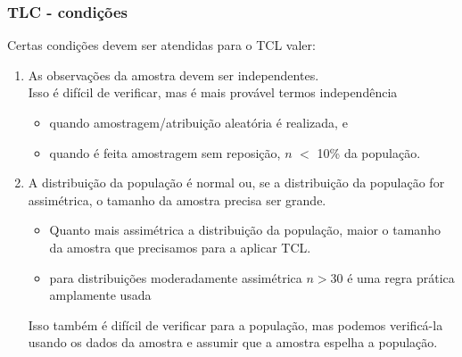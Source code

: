 \begin{frame}
\frametitle{TLC - condições}
\justifying
Certas condições devem ser atendidas para o TCL valer:

\begin{enumerate}
\justifying
\footnotesize
\item {} As observações da amostra devem ser independentes. \\
\justifying
Isso é difícil de verificar, mas é mais provável termos independência 
\begin{itemize}
\footnotesize
\justifying
\item quando amostragem/atribuição aleatória é realizada, e 
\justifying
\item quando é feita amostragem sem reposição, $n$ $<$ 10\% da população.
\end{itemize}

\pause
\justifying
\item {} A distribuição da população é normal ou, se a distribuição da população for assimétrica, o tamanho da amostra precisa ser grande.\\

\begin{itemize}
\footnotesize
\justifying
\item Quanto mais assimétrica a distribuição da população, maior o tamanho da amostra que precisamos para a aplicar TCL.
\justifying
\item para distribuições moderadamente assimétrica $n > 30$ é uma regra prática amplamente usada \\
\end{itemize}

Isso também é difícil de verificar para a população, mas podemos verificá-la usando os dados da amostra e assumir que a amostra espelha a população.

\end{enumerate}
\end{frame}

